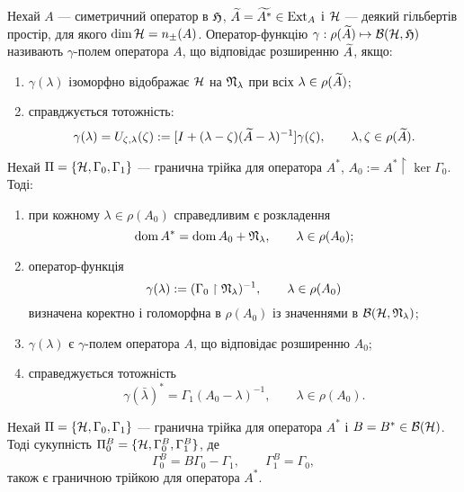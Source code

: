 \begin{definition}
	Нехай $A$ --- симетричний оператор в $\mathfrak{H}$, $\widetilde A = \widetilde{A^*}\in\operatorname{Ext}_A$ і $\mathcal{H}$ --- деякий гільбертів простір, для якого $\dim \mathcal{H} = n_\pm(A)$. Оператор-функцію $\gamma:\rho(\widetilde A) \mapsto \mathcal{B}(\mathcal{H},\mathfrak{H})$ називають $\gamma$-полем оператора $A$, що відповідає розширенню $\widetilde A$, якщо:
	\begin{enumerate}
		\item $\gamma(\lambda)$ ізоморфно відображає $\mathcal{H}$ на $\mathfrak{N}_\lambda$ при всіх $\lambda\in\rho(\widetilde A)$;
		\item справджується тотожність:
		\begin{equation*}
			\gamma(\lambda) = U_{\zeta,\lambda}(\zeta) := [I+(\lambda-\zeta)(\widetilde A - \lambda)^{-1}]\gamma(\zeta), \qquad	\lambda,\zeta \in \rho(\widetilde A).
		\end{equation*}
	\end{enumerate}
\end{definition}

\begin{lemma}
	Нехай $\Pi = \{\mathcal{H}, \Gamma_0, \Gamma_1\}$ --- гранична трійка для оператора $A^*$, $A_0:=A^*\upharpoonright \ker \Gamma_0$. Тоді:
	\begin{enumerate}
		\item при кожному $\lambda \in \rho(A_0)$ справедливим є розкладення
		\begin{equation*}
			\operatorname{dom} A^* = \operatorname{dom} A_0 + \mathfrak{N}_\lambda, \qquad \lambda\in \rho(A_0);
		\end{equation*}
		\item оператор-функція
		\begin{equation*}
			\gamma(\lambda):=(\Gamma_0\upharpoonright \mathfrak{N}_\lambda)^{-1}, \qquad \lambda\in\rho(A_0)
		\end{equation*}
		визначена коректно і голоморфна в $\rho(A_0)$ із значеннями в $\mathcal{B}(\mathcal{H},\mathfrak{N}_\lambda)$;
		\item $\gamma(\lambda)$ є $\gamma$-полем оператора $A$, що відповідає розширенню $A_0$;
		\item справеджується тотожність
		\begin{equation*}
			\gamma(\bar \lambda)^* = \Gamma_1(A_0 - \lambda)^{-1}, \qquad	\lambda\in \rho(A_0).
		\end{equation*}
	\end{enumerate}
\end{lemma}

\begin{proposition}
	Нехай $\Pi = \{\mathcal{H}, \Gamma_0, \Gamma_1\}$ --- гранична трійка для оператора $A^*$ і $B=B^*\in \mathcal{B}(\mathcal{H})$. Тоді сукупність $\Pi^B_0 = \{\mathcal{H},\Gamma^B_0,\Gamma^B_1\}$, де
	\begin{equation*}
		\Gamma^B_0 = B\Gamma_0 - \Gamma_1, \qquad \Gamma^B_1 = \Gamma_0,
	\end{equation*}
	також є граничною трійкою для оператора $A^*$.
\end{proposition}

